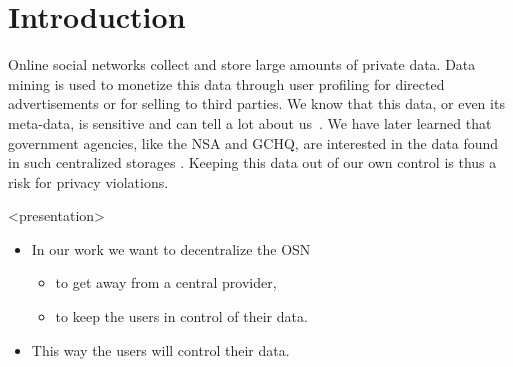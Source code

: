 \acresetall{}
\section{Introduction}
%


Online social networks collect and store large amounts of private data.
Data mining is used to monetize this data through user profiling for directed 
advertisements or for selling to third parties.
We know that this data, or even its meta-data, is sensitive and can tell a lot 
about us~\cite[e.g.][]{pregnancy}.
We have later learned that government agencies, like the \ac{NSA} and 
\ac{GCHQ}, are interested in the data found in such centralized storages 
\cite{prism}.
Keeping this data out of our own control is thus a risk for privacy violations.

\begin{frame}<presentation>
  \begin{itemize}

    \item In our work we want to decentralize the \ac{OSN}
      \begin{itemize}
        \item to get away from a central provider,
        \item to keep the users in control of their data.
      \end{itemize}

    \item This way the users will control their data.


  \end{itemize}
\end{frame}

